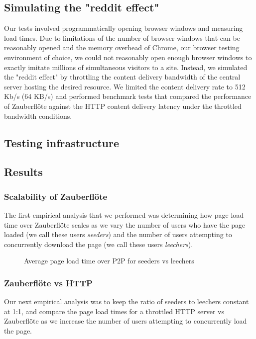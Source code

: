 \documentclass[letterpaper,twocolumn,10pt]{article}
\newcommand{\zbf}{Zauberfl\"{o}te\xspace}
\begin{document}
\subsection{Simulating the "reddit effect"}
Our tests involved programmatically opening browser windows and measuring load times.
Due to limitations of the number of browser windows that can be reasonably opened
and the memory overhead of Chrome, our browser testing environment of choice, we could
not reasonably open enough browser windows to exactly imitate millions of simultaneous
visitors to a site. Instead, we simulated the "reddit effect" by throttling the content delivery
bandwidth of the central server hosting the desired resource. We limited the content delivery
rate to 512 Kb/s (64 KB/s) and performed benchmark tests that compared the performance of \zbf
against the HTTP content delivery latency under the throttled bandwidth conditions.


\subsection{Testing infrastructure}


\subsection{Results}


\subsubsection{Scalability of \zbf}
The first empirical analysis that we performed was determining how page load time over \zbf scales as we vary the number of users who have the page loaded (we call these users \textit{seeders}) and the number of users attempting to concurrently download the page (we call these users \textit{leechers}).

\begin{figure}[h]
\caption{Average page load time over P2P for seeders vs leechers}
\end{figure}



\subsubsection{\zbf vs HTTP}
Our next empirical analysis was to keep the ratio of seeders to leechers constant at 1:1, and compare the page load times for a throttled HTTP server vs \zbf as we increase the number of users attempting to concurrently load the page.
\end{document}
